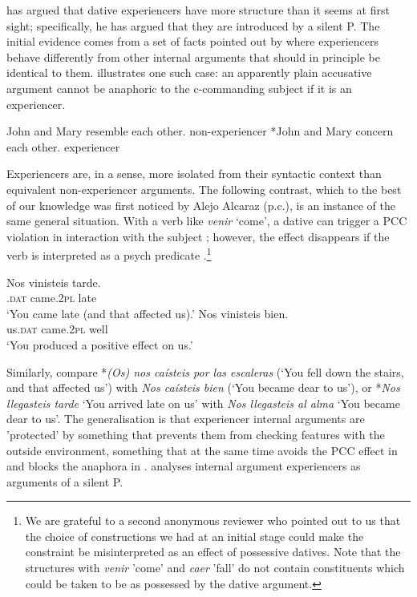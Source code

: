 \documentclass[output=paper,colorlinks,citecolor=brown,nonflat]{langsci/langscibook}
\begin{document}
\citet{Landau2010} has argued that dative experiencers have more structure than it seems at first sight; specifically, he has argued that they are introduced by a silent P. The initial evidence comes from a set of facts pointed out by \citeauthor{Landau2010} where experiencers behave differently from other internal arguments that should in principle be identical to them.  illustrates one such case: an apparently plain accusative argument cannot be anaphoric to the c-commanding subject if it is an experiencer.  

\ea%
    \label{ex:fabregas:29}
    \ea\label{ex:fabregas:29a}
    John and Mary resemble each other. \hfill non-experiencer
    \ex\label{ex:fabregas:29b}
    *John and Mary concern each other. \hfill experiencer
    \z
\z

Experiencers are, in a sense, more isolated from their syntactic context than equivalent non-experiencer arguments. The following contrast, which to the best of our knowledge was first noticed by Alejo Alcaraz (p.c.), is an instance of the same general situation. With a verb like \textit{venir} `come', a dative can trigger a PCC violation in interaction with the subject ; however, the effect disappears if the verb is interpreted as a psych predicate .\footnote{We are grateful to a second anonymous reviewer who pointed out to us that the choice of constructions we had at an initial stage could make the constraint be misinterpreted as an effect of possessive datives. Note that the structures with \textit{venir} 'come' and \textit{caer} 'fall' do not contain constituents which could be taken to be as possessed by the dative argument.}

\ea%
    \label{ex:fabregas:30}
    \ea\label{ex:fabregas:30a}
    \gll    *Nos     vinisteis   tarde.\\
            \textsc{.dat}   {came.2}\textsc{pl}   {late}\\
    \glt    `You came late (and that affected us).'
    \ex\label{ex:fabregas:30b}
    \gll    Nos     vinisteis     bien.\\
            {us}\textsc{.dat}  {came.2}\textsc{pl}   {well}\\
    \glt `You produced a positive effect on us.'
    \z
\z

Similarly, compare *\textit{(Os) nos caísteis por las escaleras} (`You fell down the stairs, and that affected us') with \textit{Nos caísteis bien} (`You became dear to us'), or *\textit{Nos llegasteis tarde} `You arrived late on us' with \textit{Nos llegasteis al alma} `You became dear to us'. The generalisation is that experiencer internal arguments are 'protected' by something that prevents them from checking features with the outside environment, something that at the same time avoids the PCC effect in  and blocks the anaphora in . \citet{Landau2010} analyses internal argument experiencers as arguments of a silent P.
\end{document}
